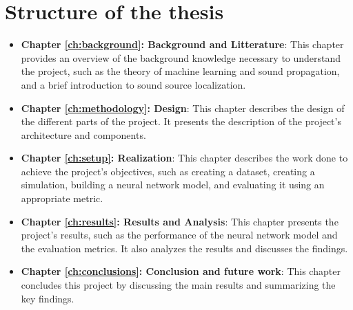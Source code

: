 \section{Structure of the thesis}


\begin{itemize}
    \item \textbf{Chapter \ref{ch:background}: Background and Litterature}: This chapter provides an overview of the background knowledge necessary to understand the project, such as the theory of machine learning and sound propagation, and a brief introduction to sound source localization.
    \item \textbf{Chapter \ref{ch:methodology}: Design}: This chapter describes the design of the different parts of the project. It presents the description of the project's architecture and components.
    \item \textbf{Chapter \ref{ch:setup}: Realization}: This chapter describes the work done to achieve the project's objectives, such as creating a dataset, creating a simulation, building a neural network model, and evaluating it using an appropriate metric.
    \item \textbf{Chapter \ref{ch:results}: Results and Analysis}: This chapter presents the project's results, such as the performance of the neural network model and the evaluation metrics. It also analyzes the results and discusses the findings.
    \item \textbf{Chapter \ref{ch:conclusions}: Conclusion and future work}: This chapter concludes this project by discussing the main results and summarizing the key findings. 
\end{itemize}
